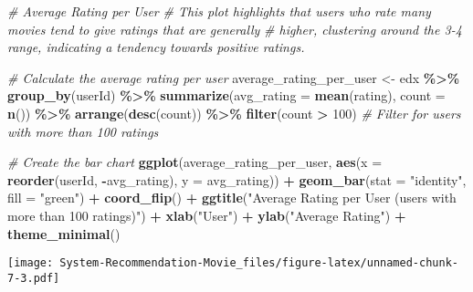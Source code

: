 \documentclass[
]{article}
\newenvironment{Shaded}{\begin{snugshade}}{\end{snugshade}}
\newcommand{\AttributeTok}[1]{\textcolor[rgb]{0.13,0.29,0.53}{#1}}
\newcommand{\CommentTok}[1]{\textcolor[rgb]{0.56,0.35,0.01}{\textit{#1}}}
\newcommand{\DecValTok}[1]{\textcolor[rgb]{0.00,0.00,0.81}{#1}}
\newcommand{\FunctionTok}[1]{\textcolor[rgb]{0.13,0.29,0.53}{\textbf{#1}}}
\newcommand{\NormalTok}[1]{#1}
\newcommand{\OtherTok}[1]{\textcolor[rgb]{0.56,0.35,0.01}{#1}}
\newcommand{\SpecialCharTok}[1]{\textcolor[rgb]{0.81,0.36,0.00}{\textbf{#1}}}
\newcommand{\StringTok}[1]{\textcolor[rgb]{0.31,0.60,0.02}{#1}}
\begin{document}
\begin{Shaded}
\begin{Highlighting}[]
\CommentTok{\# Average Rating per User}
\CommentTok{\# This plot highlights that users who rate many movies tend to give ratings that are generally}
\CommentTok{\# higher, clustering around the 3{-}4 range, indicating a tendency towards positive ratings.}

\CommentTok{\# Calculate the average rating per user}
\NormalTok{average\_rating\_per\_user }\OtherTok{\textless{}{-}}\NormalTok{ edx }\SpecialCharTok{\%\textgreater{}\%}
  \FunctionTok{group\_by}\NormalTok{(userId) }\SpecialCharTok{\%\textgreater{}\%}
  \FunctionTok{summarize}\NormalTok{(}\AttributeTok{avg\_rating =} \FunctionTok{mean}\NormalTok{(rating), }\AttributeTok{count =} \FunctionTok{n}\NormalTok{()) }\SpecialCharTok{\%\textgreater{}\%}
  \FunctionTok{arrange}\NormalTok{(}\FunctionTok{desc}\NormalTok{(count)) }\SpecialCharTok{\%\textgreater{}\%}
  \FunctionTok{filter}\NormalTok{(count }\SpecialCharTok{\textgreater{}} \DecValTok{100}\NormalTok{)  }\CommentTok{\# Filter for users with more than 100 ratings}

\CommentTok{\# Create the bar chart}
\FunctionTok{ggplot}\NormalTok{(average\_rating\_per\_user, }\FunctionTok{aes}\NormalTok{(}\AttributeTok{x =} \FunctionTok{reorder}\NormalTok{(userId, }\SpecialCharTok{{-}}\NormalTok{avg\_rating), }\AttributeTok{y =}\NormalTok{ avg\_rating)) }\SpecialCharTok{+}
  \FunctionTok{geom\_bar}\NormalTok{(}\AttributeTok{stat =} \StringTok{"identity"}\NormalTok{, }\AttributeTok{fill =} \StringTok{"green"}\NormalTok{) }\SpecialCharTok{+}
  \FunctionTok{coord\_flip}\NormalTok{() }\SpecialCharTok{+}
  \FunctionTok{ggtitle}\NormalTok{(}\StringTok{"Average Rating per User (users with more than 100 ratings)"}\NormalTok{) }\SpecialCharTok{+}
  \FunctionTok{xlab}\NormalTok{(}\StringTok{"User"}\NormalTok{) }\SpecialCharTok{+}
  \FunctionTok{ylab}\NormalTok{(}\StringTok{"Average Rating"}\NormalTok{) }\SpecialCharTok{+}
  \FunctionTok{theme\_minimal}\NormalTok{()}
\end{Highlighting}
\end{Shaded}

\texttt{[image: System-Recommendation-Movie\_files/figure-latex/unnamed-chunk-7-3.pdf]}
\end{document}
